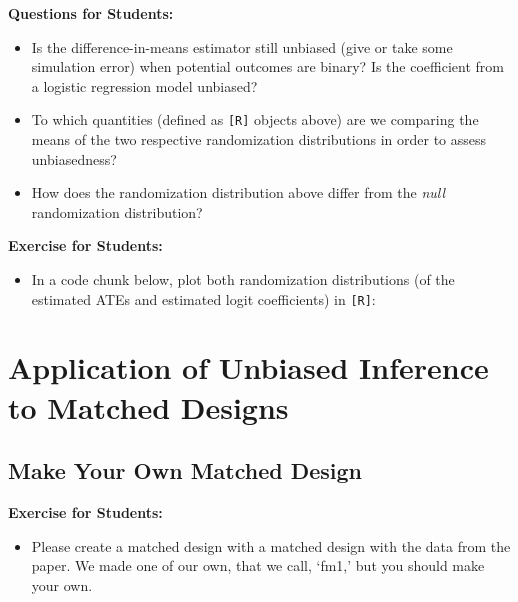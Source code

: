 \documentclass[11pt,leqno]{article}\usepackage[]{graphicx}\usepackage[]{color}
\theoremstyle{newstyle}
\begin{document}
\vspace{5mm}
\begin{mdframed}
\textbf{Questions for Students:}
\vspace{-5mm}
\begin{itemize}\itemsep1pt
\item Is the difference-in-means estimator still unbiased (give or take some simulation error) when potential outcomes are binary? Is the coefficient from a logistic regression model unbiased?
\item To which quantities (defined as \texttt{[R]} objects above) are we comparing the means of the two respective randomization distributions in order to assess unbiasedness?
\item How does the randomization distribution above differ from the \textit{null} randomization distribution?
\end{itemize}
\end{mdframed}

\vspace{5mm}
\begin{mdframed}
\textbf{Exercise for Students:}
\vspace{-5mm}
\begin{itemize}\itemsep1pt
\item In a code chunk below, plot both randomization distributions (of the estimated ATEs and estimated logit coefficients) in \texttt{[R]}:
\end{itemize}
\end{mdframed}



\section{Application of Unbiased Inference to Matched Designs}

\subsection{Make Your Own Matched Design}

\vspace{5mm}
\begin{mdframed}
\textbf{Exercise for Students:}
\vspace{-5mm}
\begin{itemize}\itemsep1pt
\item Please create a matched design with a matched design with the data from the
\citet{cerdaetal2012} paper. We made one of our own, that we call, `fm1,' but
you should make your own.
\end{itemize}
\end{mdframed}
\end{document}
